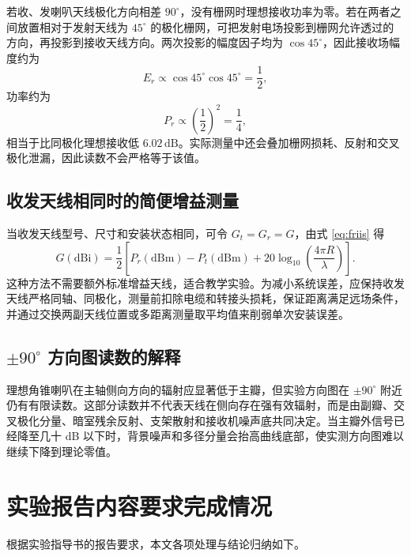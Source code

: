 \documentclass{ctexart}
\begin{document}
若收、发喇叭天线极化方向相差 $90^\circ$，没有栅网时理想接收功率为零。若在两者之间放置相对于发射天线为 $45^\circ$ 的极化栅网，可把发射电场投影到栅网允许透过的方向，再投影到接收天线方向。两次投影的幅度因子均为 $\cos45^\circ$，因此接收场幅度约为
\[
  E_r\propto \cos45^\circ\cos45^\circ=\frac{1}{2},
\]
功率约为
\[
  P_r\propto \left(\frac{1}{2}\right)^2=\frac{1}{4},
\]
相当于比同极化理想接收低 $6.02\,\mathrm{dB}$。实际测量中还会叠加栅网损耗、反射和交叉极化泄漏，因此读数不会严格等于该值。

\subsection{收发天线相同时的简便增益测量}

当收发天线型号、尺寸和安装状态相同，可令 $G_t=G_r=G$，由式 \eqref{eq:friis} 得
\begin{equation}
  G(\mathrm{dBi})=\frac{1}{2}\left[P_r(\mathrm{dBm})-P_t(\mathrm{dBm})
  +20\log_{10}\left(\frac{4\pi R}{\lambda}\right)\right].
  \label{eq:same-antenna-gain}
\end{equation}
这种方法不需要额外标准增益天线，适合教学实验。为减小系统误差，应保持收发天线严格同轴、同极化，测量前扣除电缆和转接头损耗，保证距离满足远场条件，并通过交换两副天线位置或多距离测量取平均值来削弱单次安装误差。

\subsection{$\pm90^\circ$ 方向图读数的解释}

理想角锥喇叭在主轴侧向方向的辐射应显著低于主瓣，但实验方向图在 $\pm90^\circ$ 附近仍有有限读数。这部分读数并不代表天线在侧向存在强有效辐射，而是由副瓣、交叉极化分量、暗室残余反射、支架散射和接收机噪声底共同决定。当主瓣外信号已经降至几十 dB 以下时，背景噪声和多径分量会抬高曲线底部，使实测方向图难以继续下降到理论零值。

\section{实验报告内容要求完成情况}

根据实验指导书的报告要求，本文各项处理与结论归纳如下。
\end{document}
